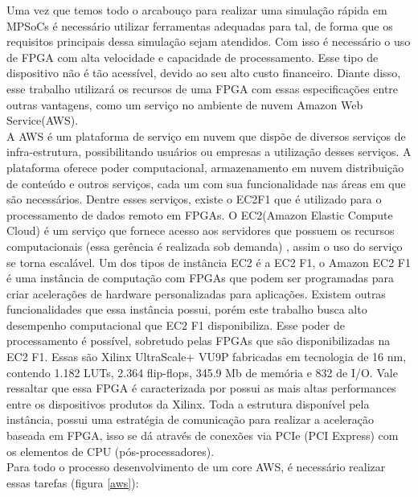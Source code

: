 \documentclass[conference]{IEEEtran}
\begin{document}
	Uma vez que temos todo o arcabouço para realizar uma simulação rápida em MPSoCs é necessário utilizar ferramentas adequadas para tal, de forma que os requisitos principais dessa simulação sejam atendidos. Com isso é necessário o uso de FPGA com alta velocidade e capacidade de processamento. Esse tipo de dispositivo não é tão acessível, devido ao seu alto custo financeiro. Diante disso, esse trabalho utilizará os recursos de uma FPGA com essas especificações entre outras vantagens, como um serviço no ambiente de nuvem Amazon Web Service(AWS).\\
	A AWS é um plataforma de serviço em nuvem que dispõe de diversos serviços de infra-estrutura, possibilitando usuários ou empresas a utilização desses serviços. A plataforma oferece poder computacional, armazenamento em nuvem distribuição de conteúdo e outros serviços, cada um com sua funcionalidade nas áreas em que são necessários. Dentre esses serviços, existe o EC2F1 que é utilizado para o processamento de dados remoto em FPGAs. O EC2(Amazon Elastic Compute Cloud) é um serviço que fornece acesso aos servidores que possuem os recursos computacionais (essa gerência é realizada sob demanda) , assim o uso do serviço se torna escalável. Um dos tipos de instância EC2 é a EC2 F1, o Amazon EC2 F1 é uma instância de computação com FPGAs que podem ser programadas para criar acelerações de hardware personalizadas para aplicações. Existem outras funcionalidades que essa instância possui, porém este trabalho busca alto desempenho computacional que EC2 F1 disponibiliza. Esse poder de processamento é possível, sobretudo pelas FPGAs que são disponibilizadas na EC2 F1. Essas são Xilinx UltraScale+ VU9P fabricadas em tecnologia de 16 nm, contendo 
	1.182 LUTs, 2.364 flip-flops, 345.9 Mb de memória e 832 de I/O. Vale ressaltar que essa FPGA é caracterizada por possui as mais altas performances entre os dispositivos produtos da Xilinx. Toda a estrutura disponível pela instância, possui uma estratégia de comunicação para realizar a aceleração baseada em FPGA, isso se dá através de conexões via PCIe (PCI Express) com os elementos de CPU (pós-processadores).\\
	Para todo o  processo desenvolvimento de um core AWS, é necessário realizar essas tarefas (figura \ref{aws}):
\end{document}
